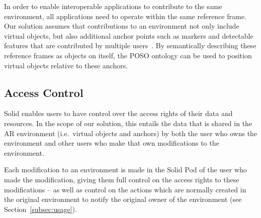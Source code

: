 In order to enable interoperable applications to contribute to the same environment, all applications need to operate within the same reference frame. Our solution assumes that contributions to an environment not only include virtual objects, but also additional anchor points such as markers and detectable features that are contributed by multiple users~\cite{fidmark}. By semantically describing these reference frames as objects on itself, the POSO ontology can be used to position virtual objects relative to these anchors.

\subsection{Access Control} \label{subsec:access}
Solid enables users to have control over the access rights of their data and resources. In the scope of our solution, this entails the data that is shared in the AR environment (i.e.~virtual objects and anchors) by both the user who owns the environment and other users who make that own modifications to the environment.

Each modification to an environment is made in the Solid Pod of the user who made the modification, giving them full control on the access rights to these modifications -- as well as control on the actions which are normally created in the original environment to notify the original owner of the environment (see Section~\ref{subsec:usage}).